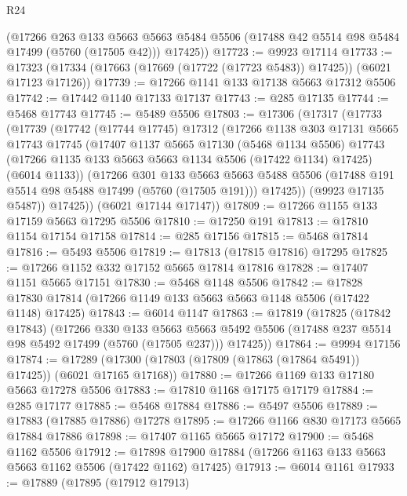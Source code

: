 \begin{lexlean}{R24}
\begin{coremodule}
      (@17266
        @263
        @133
        @5663
        @5663
        @5484
        @5506
        (@17488 @42 @5514 @98 @5484 @17499 (@5760 (@17505 @42)))
        @17425))
@17723 := @9923 @17114
@17733 := @17323 (@17334 (@17663 (@17669 (@17722 (@17723 @5483)) @17425)) (@6021 @17123 @17126))
@17739 := @17266 @1141 @133 @17138 @5663 @17312 @5506
@17742 := @17442 @1140 @17133 @17137
@17743 := @285 @17135
@17744 := @5468 @17743
@17745 := @5489 @5506
@17803 := @17306
    (@17317
      (@17733
        (@17739
          (@17742
            (@17744 @17745)
            @17312
            (@17266
              @1138
              @303
              @17131
              @5665
              @17743
              @17745
              (@17407
                @1137
                @5665
                @17130
                (@5468 @1134 @5506)
                @17743
                (@17266 @1135 @133 @5663 @5663 @1134 @5506 (@17422 @1134) @17425)
                (@6014 @1133))
              (@17266
                @301
                @133
                @5663
                @5663
                @5488
                @5506
                (@17488 @191 @5514 @98 @5488 @17499 (@5760 (@17505 @191)))
                @17425))
            (@9923 @17135 @5487))
          @17425))
      (@6021 @17144 @17147))
@17809 := @17266 @1155 @133 @17159 @5663 @17295 @5506
@17810 := @17250 @191
@17813 := @17810 @1154 @17154 @17158
@17814 := @285 @17156
@17815 := @5468 @17814
@17816 := @5493 @5506
@17819 := @17813 (@17815 @17816) @17295
@17825 := @17266 @1152 @332 @17152 @5665 @17814 @17816
@17828 := @17407 @1151 @5665 @17151
@17830 := @5468 @1148 @5506
@17842 := @17828 @17830 @17814 (@17266 @1149 @133 @5663 @5663 @1148 @5506 (@17422 @1148) @17425)
@17843 := @6014 @1147
@17863 := @17819
    (@17825
      (@17842 @17843)
      (@17266
        @330
        @133
        @5663
        @5663
        @5492
        @5506
        (@17488 @237 @5514 @98 @5492 @17499 (@5760 (@17505 @237)))
        @17425))
@17864 := @9994 @17156
@17874 := @17289 (@17300 (@17803 (@17809 (@17863 (@17864 @5491)) @17425)) (@6021 @17165 @17168))
@17880 := @17266 @1169 @133 @17180 @5663 @17278 @5506
@17883 := @17810 @1168 @17175 @17179
@17884 := @285 @17177
@17885 := @5468 @17884
@17886 := @5497 @5506
@17889 := @17883 (@17885 @17886) @17278
@17895 := @17266 @1166 @830 @17173 @5665 @17884 @17886
@17898 := @17407 @1165 @5665 @17172
@17900 := @5468 @1162 @5506
@17912 := @17898 @17900 @17884 (@17266 @1163 @133 @5663 @5663 @1162 @5506 (@17422 @1162) @17425)
@17913 := @6014 @1161
@17933 := @17889
    (@17895
      (@17912 @17913)

\end{coremodule}
\end{lexlean}
